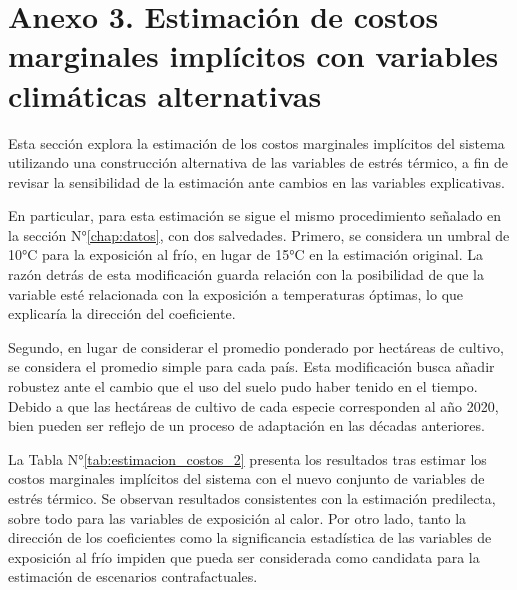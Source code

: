 \chapter{Anexo 3. Estimación de costos marginales implícitos con variables climáticas alternativas}
\label{chap:anexo3}

Esta sección explora la estimación de los costos marginales implícitos del sistema utilizando una construcción alternativa de las variables de estrés térmico, a fin de revisar la sensibilidad de la estimación ante cambios en las variables explicativas.

En particular, para esta estimación se sigue el mismo procedimiento señalado en la sección N°\ref{chap:datos}, con dos salvedades. Primero, se considera un umbral de 10°C para la exposición al frío, en lugar de 15°C en la estimación original. La razón detrás de esta modificación guarda relación con la posibilidad de que la variable esté relacionada con la exposición a temperaturas óptimas, lo que explicaría la dirección del coeficiente.

Segundo, en lugar de considerar el promedio ponderado por hectáreas de cultivo, se considera el promedio simple para cada país. Esta modificación busca añadir robustez ante el cambio que el uso del suelo pudo haber tenido en el tiempo. Debido a que las hectáreas de cultivo de cada especie corresponden al año 2020, bien pueden ser reflejo de un proceso de adaptación en las décadas anteriores.

La Tabla N°\ref{tab:estimacion_costos_2} presenta los resultados tras estimar los costos marginales implícitos del sistema con el nuevo conjunto de variables de estrés térmico. Se observan resultados consistentes con la estimación predilecta, sobre todo para las variables de exposición al calor. Por otro lado, tanto la dirección de los coeficientes como la significancia estadística de las variables de exposición al frío impiden que pueda ser considerada como candidata para la estimación de escenarios contrafactuales.




